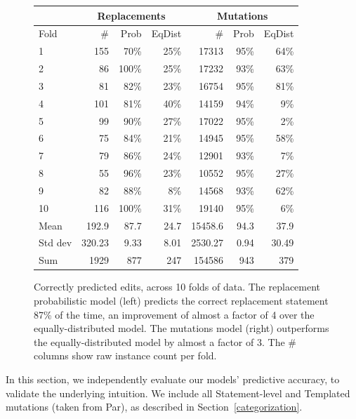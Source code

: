 \documentclass[conference]{IEEEtran}
\begin{document}
\begin{figure}[ht]
{\footnotesize
{\centering
\begin{tabular}{l|rrr|rrr}
\toprule
   &\multicolumn{3}{c|}{Replacements} &\multicolumn{3}{c}{Mutations} \\
\midrule
Fold	& \# &Prob& EqDist& \#&Prob& EqDist \\
\midrule
1	& 155&70\%&	25\% &17313&  95\% & 64\%   \\
2	& 86&100\%&	25\%  & 17232& 93\% & 63\%   \\
3	& 81&82\%	&23\%  & 16754& 95\% & 81\% \\
4	& 101&81\%	&40\%  & 14159& 94\% & 9\%   \\
5	& 99&90\%	&27\%  & 17022& 95\% & 2\%  \\
6	& 75&84\%	&21\%  & 14945& 95\%& 58\%  \\
7	& 79&86\%	&24\%  & 12901& 93\%& 7\%  \\
8	& 55&96\%	&23\%  & 10552& 95\%& 27\%  \\
9	& 82&88\%	&8\%  & 14568& 93\%& 62\% \\
10	& 116&100\%	&31\% & 19140 & 95\% & 6\% \\
\midrule
Mean	& 192.9 &87.7	&24.7& 15458.6  & 94.3 & 37.9  \\
\midrule
Std dev	& 320.23&9.33&	8.01 & 2530.27 & 0.94 & 30.49   \\
\midrule
Sum & 1929&877 & 247 &  154586& 943 & 379  \\
\bottomrule
\end{tabular}
\center
  \caption{Correctly predicted edits, across 10 folds of data.
The replacement probabilistic model (left) predicts
    the correct replacement statement 87\% of the time,
    an improvement of almost a factor of 4 over the equally-distributed model. 
    The mutations model (right) outperforms the equally-distributed model by 
    almost a factor of 3. The \# columns show raw instance count per fold. \label{results10fcv}} 
}}
\end{figure} 


In this section, we independently evaluate our models' predictive
accuracy, to validate the underlying intuition.  
We include all Statement-level and Templated mutations
(taken from Par), as described in
Section~\ref{categorization}.
\end{document}
